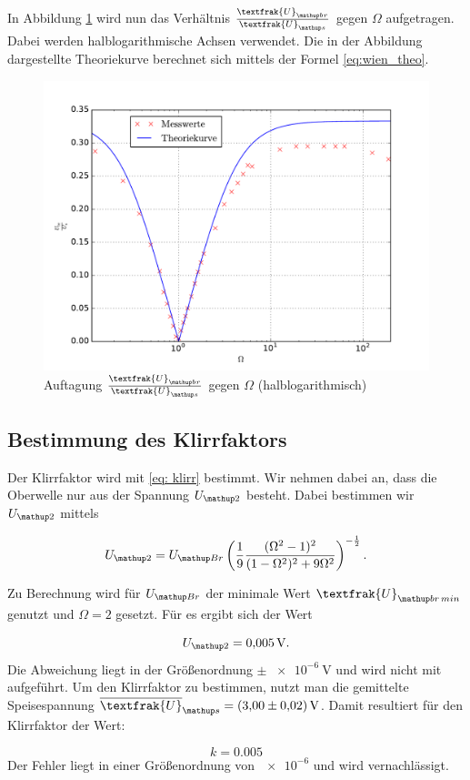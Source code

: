 In Abbildung \ref{fig: plot}
wird nun das Verhältnis $\frac{\textfrak{U}\ua{br}}{\textfrak{U}\ua{s}}$
gegen $\Omega$ aufgetragen. Dabei werden halblogarithmische Achsen verwendet. %
Die in der Abbildung dargestellte Theoriekurve berechnet sich mittels der Formel
\eqref{eq:wien_theo}.

\begin{figure}
  \centering
  \includegraphics[width=1\textwidth]{pics/ub_us.pdf}
  \caption{Auftagung $\frac{\textfrak{U}\ua{br}}{\textfrak{U}\ua{s}}$  gegen $\Omega$ (halblogarithmisch) }
  \label{fig: plot}
\end{figure}

\subsection{Bestimmung des Klirrfaktors}

Der Klirrfaktor wird mit \eqref{eq: klirr} bestimmt.
Wir nehmen dabei an, dass die Oberwelle nur aus der Spannung $U\ua{2}$ besteht. %
Dabei bestimmen wir $U\ua{2}$ mittels

\begin{equation*}
 U\ua{2}=U\ua{Br}\left(\frac{1}{9} \frac{(\Omega^2 - 1)^2 }{(1 - \Omega ^2)^2 + 9 \Omega ^2}\right)^{-\frac{1}{2}}. %
\end{equation*}

Zu Berechnung wird für $U\ua{Br}$ der minimale Wert $\textfrak{U}\ua{br\,min}$ %
genutzt und $\Omega=2$ gesetzt.
Für es ergibt sich der Wert %

\begin{equation*}
 U\ua{2}=\SI{0.005}{\volt}.
\end{equation*}
Die Abweichung liegt in der Größenordnung $\pm \, \SI{e-6}{\volt}$ und
wird nicht mit aufgeführt.
Um den Klirrfaktor zu bestimmen, nutzt man die gemittelte Speisespannung
$\overline{\textfrak{U}}\ua{s}=\SI{3.0\pm0.02}{\volt}$.
Damit resultiert für den Klirrfaktor der Wert:

\begin{equation*}
k=0.005
\end{equation*}
Der Fehler liegt in einer Größenordnung von $\num{e-6}$ und wird vernachlässigt.
